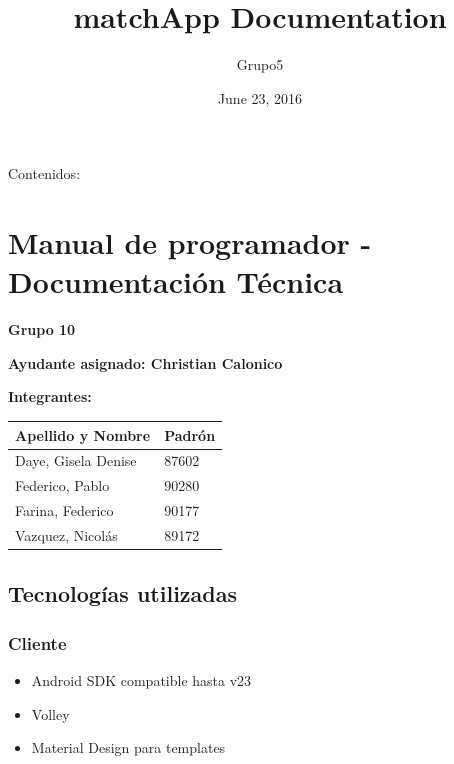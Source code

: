 \documentclass[letterpaper,10pt,english]{sphinxmanual}
\title{matchApp Documentation}
\date{June 23, 2016}
\author{Grupo5}
\begin{document}
\maketitle
\tableofcontents
{}\label{index::doc}


Contenidos:


\chapter{Manual de programador - Documentación Técnica}
\label{manuals::doc}\label{manuals:manual-de-programador-documentacion-tecnica}\label{manuals:documentacion-de-matchapp}
\textbf{Grupo 10}

\textbf{Ayudante asignado: Christian Calonico}

\textbf{Integrantes:}

\begin{tabulary}{\linewidth}{|L|L|}
\hline
\textsf{\relax 
Apellido y Nombre
} & \textsf{\relax 
Padrón
}\\
\hline
Daye, Gisela Denise
 & 
87602
\\
\hline
Federico, Pablo
 & 
90280
\\
\hline
Farina, Federico
 & 
90177
\\
\hline
Vazquez, Nicolás
 & 
89172
\\
\hline\end{tabulary}



\section{Tecnologías utilizadas}
\label{manuals:tecnologias-utilizadas}

\subsection{Cliente}
\label{manuals:cliente}\begin{itemize}
\item {} 
Android SDK compatible hasta v23

\item {} 
Volley

\item {} 
Material Design para templates

\end{itemize}
\end{document}
